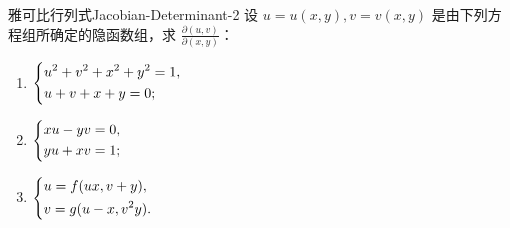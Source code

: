 \begin{problem}{雅可比行列式}{Jacobian-Determinant-2}
    设 $u = u(x,y), v = v(x,y)$ 是由下列方程组所确定的隐函数组，求 $\frac{\partial(u,v)}{\partial(x,y)}$：
    \begin{enumerate}
        \item $\begin{dcases} u^2 + v^2 + x^2 + y^2 = 1, \\ u + v + x + y = 0; \end{dcases}$
        \item $\begin{dcases} xu - yv = 0, \\ yu + xv = 1; \end{dcases}$
        \item $\begin{dcases} u = f(ux, v + y), \\ v = g(u - x, v^2y). \end{dcases}$
    \end{enumerate}
\end{problem}

